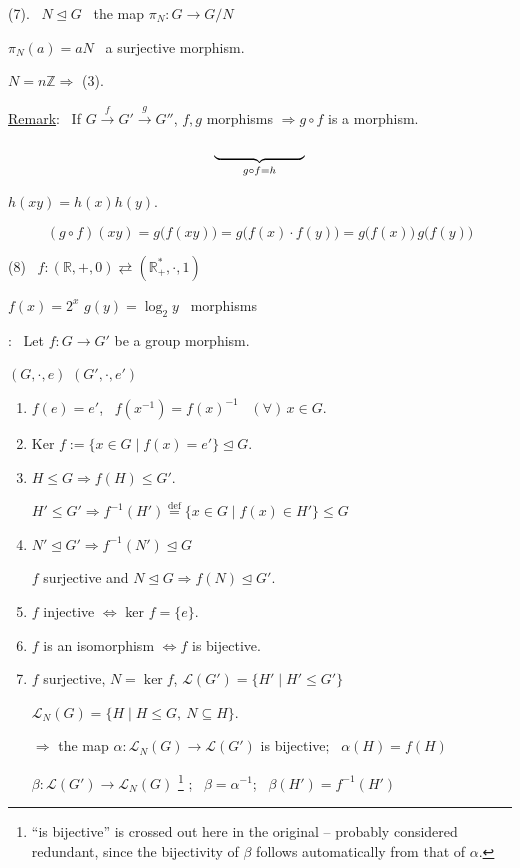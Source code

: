 \documentclass[12pt]{article}
\begin{document}
\noindent (7). \ $N\trianglelefteq G$ \ the map $\pi_N: G\to G/N$

\noindent $\pi_N(a)=aN$ \ a surjective morphism.

\bigskip
\noindent $N=n\mathbb{Z} \Rightarrow$ (3).

\bigskip
\noindent\underline{Remark}: \ If $G \xrightarrow{f} G' \xrightarrow{g} G''$, $f,g$ morphisms $\Rightarrow g\circ f$ is a morphism.

\[
\underbrace{\hphantom{G \xrightarrow{f} G' \xrightarrow{g} G''}}_{g\circ f = h}
\]

\noindent $h(xy) = h(x)h(y)$.

\[
(g\circ f)(xy) = g\big(f(xy)\big) = g\big(f(x)\cdot f(y)\big) = g\big(f(x)\big)\,g\big(f(y)\big)
\]

\bigskip
\noindent (8) \ $f:(\mathbb{R},+,0) \rightleftarrows (\mathbb{R}_+^*,\cdot,1)$

\noindent $f(x)=2^x$ \qquad $g(y)=\log_2 y$ \ morphisms

\bigskip
\noindent{}: \ Let $f:G\to G'$ be a group morphism.

\noindent $(G,\cdot,e)$ \qquad $(G',\cdot,e')$

\begin{enumerate}
\item[(1)] $f(e)=e'$, \ $f(x^{-1})=f(x)^{-1}$ \ $(\forall)\,x\in G$.
\item[(2).] Ker $f := \{x\in G \mid f(x)=e'\} \trianglelefteq G$.
\item[(3)] $H\leq G \Rightarrow f(H)\leq G'$.

\noindent $H'\leq G' \Rightarrow f^{-1}(H') \overset{\text{def}}{=} \{x\in G \mid f(x)\in H'\} \leq G$
\item[(4).] $N'\trianglelefteq G' \Rightarrow f^{-1}(N')\trianglelefteq G$

\noindent $f$ surjective and $N\trianglelefteq G \Rightarrow f(N)\trianglelefteq G'$.
\item[(5).] $f$ injective $\Leftrightarrow$ ker $f=\{e\}$.
\item[(6).] $f$ is an isomorphism $\Leftrightarrow f$ is bijective.
\item[(7)] $f$ surjective, $N=\ker f$, $\mathcal{L}(G')=\{H' \mid H'\leq G'\}$

\noindent $\mathcal{L}_N(G) = \{H \mid H\leq G,\ N\subseteq H\}$.

\noindent $\Rightarrow$ the map $\alpha:\mathcal{L}_N(G) \to \mathcal{L}(G')$ is bijective; \ $\alpha(H)=f(H)$

\noindent $\beta: \mathcal{L}(G') \to \mathcal{L}_N(G)$ \footnote{``is bijective'' is crossed out here in the original -- probably considered redundant, since the bijectivity of $\beta$ follows automatically from that of $\alpha$.} ; \ $\beta=\alpha^{-1}$; \ $\beta(H')=f^{-1}(H')$
\end{enumerate}
\end{document}
